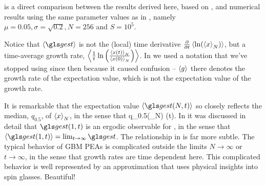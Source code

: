 is a direct comparison between the results derived
here, based on \cite{Derrida1980}, and numerical results using the same parameter 
values as in \cite{PetersKlein2013}, namely $\mu=0.05, \sigma=\sqrt{0.2}, N=256$ and $S=10^5$.


Notice that $\ave{\gest}$ is not the (local)
time derivative $\frac{\partial}{\partial t}\left\langle\ln(\left\langle x \right\rangle_N) \right\rangle$, but a time-average growth rate, $\left\langle\frac{1}{t}\ln\left( \frac{\left\langle x(t) \right\rangle_N}{\left\langle x(0) \right\rangle_N}\right) \right\rangle$. 
In \cite{PetersKlein2013} we used a notation that we've stopped using since then because it
caused confusion -- $\left\langle g \right\rangle$ there denotes the growth rate of the expectation value, which 
is not the expectation value of the growth rate. 



It is remarkable that the expectation value $\ave{\gest(N,t)}$ so closely reflects the
median, $q_{0.5}$, of $\left\langle x \right\rangle_N$, in the sense that
\be
q_{0.5}(_N) \approx \exp \left(t\right).
\ee
In \cite{PetersGell-Mann2016} it was discussed in detail that 
$\gest(1,t)$ is an ergodic observable for , in the sense that 
$\ave{\gest(1,t)}=\lim_{t\to\infty} \gest$. The relationship in 
is far more subtle. The typical behavior of GBM PEAs 
is complicated outside the limits $N\to\infty$ or $t\to\infty$, in the sense that growth rates are 
time dependent here. This complicated behavior is well represented by an 
approximation that uses physical insights into spin glasses. Beautiful!

